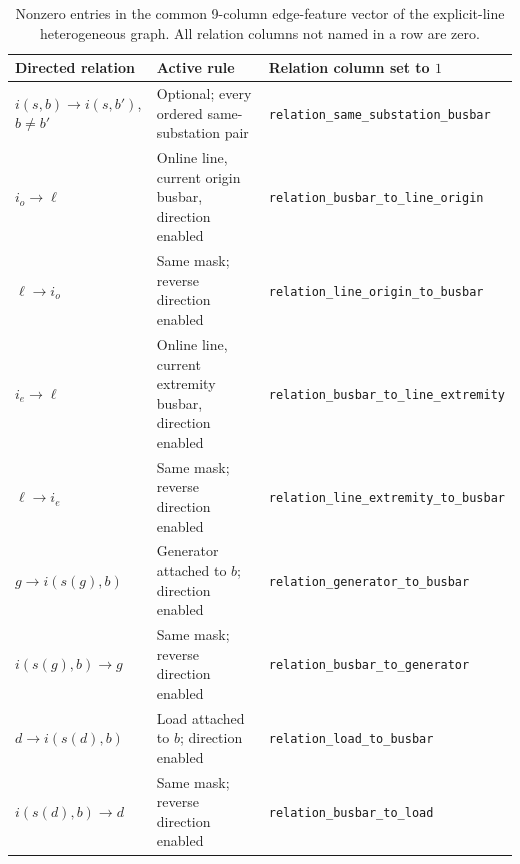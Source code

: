 \begin{table}[H]
  \centering
  \scriptsize
  \caption{Nonzero entries in the common 9-column edge-feature vector of the
  explicit-line heterogeneous graph. All relation columns not named in a row
  are zero.}
  \label{tab:heterogeneous-line-edge-features}
  \setlength{\tabcolsep}{3pt}
  \begin{tabular}{L{0.20\textwidth}L{0.31\textwidth}L{0.38\textwidth}}
    \toprule
    Directed relation & Active rule & Relation column set to $1$ \\
    \midrule
    $i(s,b)\rightarrow i(s,b')$, $b\neq b'$ & Optional; every ordered same-substation pair & \texttt{relation\_same\_substation\_busbar} \\
    $i_o\rightarrow\ell$ & Online line, current origin busbar, direction enabled & \texttt{relation\_busbar\_to\_line\_origin} \\
    $\ell\rightarrow i_o$ & Same mask; reverse direction enabled & \texttt{relation\_line\_origin\_to\_busbar} \\
    $i_e\rightarrow\ell$ & Online line, current extremity busbar, direction enabled & \texttt{relation\_busbar\_to\_line\_extremity} \\
    $\ell\rightarrow i_e$ & Same mask; reverse direction enabled & \texttt{relation\_line\_extremity\_to\_busbar} \\
    $g\rightarrow i(s(g),b)$ & Generator attached to $b$; direction enabled & \texttt{relation\_generator\_to\_busbar} \\
    $i(s(g),b)\rightarrow g$ & Same mask; reverse direction enabled & \texttt{relation\_busbar\_to\_generator} \\
    $d\rightarrow i(s(d),b)$ & Load attached to $b$; direction enabled & \texttt{relation\_load\_to\_busbar} \\
    $i(s(d),b)\rightarrow d$ & Same mask; reverse direction enabled & \texttt{relation\_busbar\_to\_load} \\
    \bottomrule
  \end{tabular}
\end{table}



